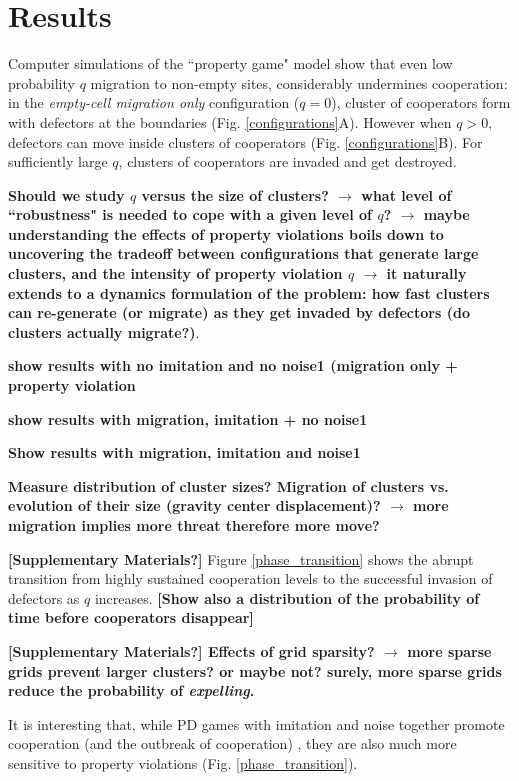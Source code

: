 \section*{Results}
Computer simulations of the ``property game" model show that even low probability $q$ migration to non-empty sites, considerably undermines cooperation: in the {\it empty-cell migration only} configuration ($q=0$), cluster of cooperators form with defectors at the boundaries (Fig. \ref{configurations}A). However when $q>0$, defectors can move inside  clusters of cooperators (Fig. \ref{configurations}B). For sufficiently large $q$, clusters of cooperators are invaded and get destroyed. 

{\bf Should we study $q$ versus the size of clusters? $\rightarrow$ what level of ``robustness" is needed to cope with a given level of $q$? $\rightarrow$ maybe understanding the effects of property violations boils down to uncovering the tradeoff between configurations that generate large clusters, and the intensity of property violation $q$ $\rightarrow$ it naturally extends to a dynamics formulation of the problem: how fast clusters can re-generate (or migrate) as they get invaded by defectors (do clusters actually migrate?)}.

{\bf show results with no imitation and no noise1 (migration only + property violation}

{\bf show results with migration, imitation + no noise1}

{\bf Show results with migration, imitation and noise1}

{\bf Measure distribution of cluster sizes? Migration of clusters vs. evolution of their size (gravity center displacement)? $\rightarrow$ more migration implies more threat therefore more move?}

{\bf [Supplementary Materials?]} Figure \ref{phase_transition} shows the abrupt transition from highly sustained cooperation levels to the successful invasion of defectors as $q$ increases. {\bf [Show also a distribution of the probability of time before cooperators disappear]}

{\bf [Supplementary Materials?] Effects of grid sparsity? $\rightarrow$ more sparse grids prevent larger clusters? or maybe not? surely, more sparse grids reduce the probability of {\it expelling}. }

It is interesting that, while PD games with imitation and noise together promote cooperation (and the outbreak of cooperation) \cite{helbing2009}, they are also much more sensitive to property violations (Fig. \ref{phase_transition}).

